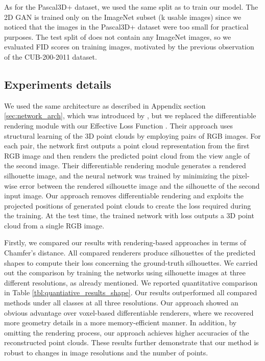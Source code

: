 \documentclass[runningheads]{llncs}
\begin{document}
As for the Pascal3D+ \cite{xiang_wacv14} dataset, we used the same split as \cite{kanazawa2018learning} to train our model. The 2D GAN is trained only on the ImageNet subset (k usable images) since we noticed that the images in the Pascal3D+ dataset were too small for practical purposes. The test split of \cite{kanazawa2018learning} does not contain any ImageNet images, so we evaluated FID scores on training images, motivated by the previous observation of the CUB-200-2011 dataset.

\subsection{Experiments details}
We used the same architecture as described in Appendix section \textcolor{blue}{\ref{sec:network_arch}}, which was introduced by \cite{DBLP:journals/corr/abs-1810-09381}, but we replaced the differentiable rendering module with our Effective Loss Function . Their approach uses structural learning of the 3D point clouds by employing pairs of RGB images. For each pair, the network first outputs a point cloud representation from the first RGB image and then renders the predicted point cloud from the view angle of the second image. Their differentiable rendering module generates a rendered silhouette image, and the neural network was trained by minimizing the pixel-wise error between the rendered silhouette image and the silhouette of the second input image. Our approach removes differentiable rendering and exploits the projected positions of generated point clouds to create the loss  required during the training. At the test time, the trained network with loss  outputs a 3D point cloud from a single RGB image.

Firstly, we compared our results with rendering-based approaches in terms of Chamfer's distance. All compared renderers produce silhouettes of the predicted shapes to compute their loss concerning the ground-truth silhouettes. We carried out the comparison by training the networks using silhouette images at three different resolutions, as already mentioned. We reported quantitative comparison in Table \ref{tbl:quantiative_results_shape}. Our results outperformed all compared methods under all classes at all three resolutions. Our approach showed an obvious advantage over voxel-based differentiable renderers, where we recovered more geometry details in a more memory-efficient manner. In addition, by omitting the rendering process, our approach achieves higher accuracies of the reconstructed point clouds. These results further demonstrate that our method is robust to changes in image resolutions and the number of points.
\end{document}
